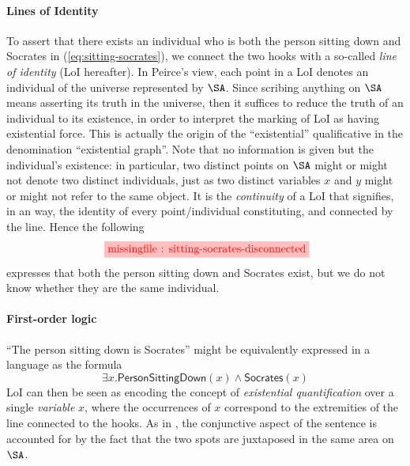 \begin{scope}
\paragraph{Lines of Identity} To assert that there exists an individual who is
both the person sitting down and Socrates in  (\ref{eq:sitting-socrates}),
we connect the two hooks with a so-called \emph{line of identity} (LoI
hereafter). In Peirce's view, each point in a LoI denotes an individual of the
universe represented by $\SA$. Since scribing anything on $\SA$ means asserting
its truth in the universe, then it suffices to reduce the truth of an individual
to its existence, in order to interpret the marking of LoI as having existential
force. This is actually the origin of the ``existential'' qualificative in the
denomination ``existential graph''. Note that no information is given but the
individual's existence: in particular, two distinct points on $\SA$ might or
might not denote two distinct individuals, just as two distinct variables $x$
and $y$ might or might not refer to the same object. It is the \emph{continuity}
of a LoI that signifies, in an  way, the identity of every
point/individual constituting, and connected by the line. Hence the following
$$\tikzfig{1}{0.5}{sitting-socrates-disconnected}$$ expresses that both the
person sitting down and Socrates exist, but we do not know whether they are the
same individual.

\paragraph{First-order logic} ``The person sitting down is Socrates'' might be
equivalently expressed in a  language as the formula
\begin{equation}
  \exists x. \mathsf{PersonSittingDown}(x) \wedge \mathsf{Socrates}(x) \label{eq:sitting-socrates-fo}
\end{equation}
LoI can then be seen as encoding the concept of \emph{existential
quantification} over a single \emph{variable} $x$, where the occurrences of $x$
correspond to the extremities of the line connected to the hooks. As in
, the conjunctive aspect of the sentence is accounted for by the fact
that the two spots are juxtaposed in the same area on $\SA$.


\end{scope}
